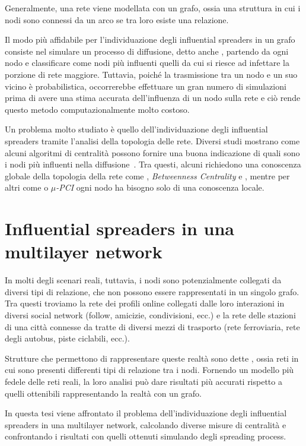 Generalmente, una rete viene modellata con un grafo, ossia una struttura in cui i 
nodi sono connessi da un arco se tra loro esiste una relazione.

Il modo più affidabile per l'individuazione degli influential spreaders in un grafo consiste nel 
simulare un processo di diffusione, detto anche \spproc, partendo da ogni nodo e 
classificare come nodi più 
influenti quelli da cui si riesce ad infettare la porzione di rete maggiore.
Tuttavia, poiché la trasmissione tra un nodo e un suo vicino è probabilistica,
occorrerebbe effettuare un gran numero di simulazioni prima di avere una stima accurata 
dell'influenza di un nodo sulla rete e ciò rende questo metodo computazionalmente 
molto costoso.

Un problema molto studiato è quello dell'individuazione degli influential spreaders tramite l'analisi della 
topologia delle rete.
Diversi studi mostrano come alcuni algoritmi di centralità possono fornire una buona indicazione di 
quali sono i nodi più influenti nella diffusione~\cite{kitsak:infsp}\cite{basaras:infsp}\cite{pei:infsp}.
Tra questi, alcuni richiedono una conoscenza globale della topologia della rete come
\emph{\PageRank}, \emph{Betweenness Centrality} e \emph{\kcore}, 
mentre per altri come \emph{\degree} o \emph{$\mu$-PCI} ogni nodo 
ha bisogno solo di una conoscenza locale.

\section{Influential spreaders in una multilayer network}

In molti degli scenari reali, tuttavia, i nodi sono potenzialmente collegati da diversi tipi di relazione, che non 
possono essere rappresentati in un singolo grafo. 
Tra questi troviamo la rete dei profili online collegati dalle loro interazioni
in diversi social network (follow, amicizie, condivisioni, ecc.) e la rete delle stazioni di 
una città connesse da tratte di diversi mezzi di trasporto (rete ferroviaria, rete degli autobus, 
piste ciclabili, ecc.).

Strutture che permettono di rappresentare queste realtà sono dette \muln, ossia reti in cui sono 
presenti differenti tipi di relazione tra i nodi. Fornendo un modello più fedele 
delle reti reali, la loro analisi può dare risultati più accurati rispetto 
a quelli ottenibili rappresentando la realtà con un grafo.

In questa tesi viene affrontato il problema dell'individuazione degli influential spreaders in 
una multilayer network, calcolando diverse misure di centralità e confrontando i 
risultati con quelli ottenuti simulando degli spreading process.
